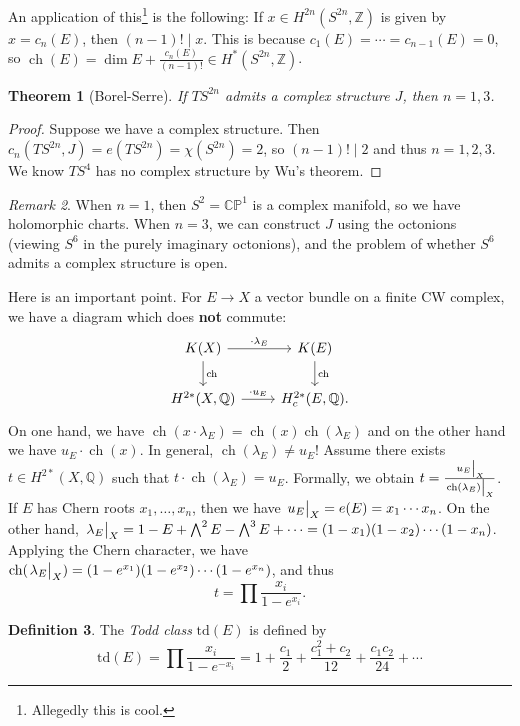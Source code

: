 \documentclass[leqno, openany]{memoir}
\newtheorem{thm}{Theorem}[section]
\theoremstyle{definition}
\newtheorem{defn}[thm]{Definition}
\theoremstyle{remark}
\newtheorem{rmk}[thm]{Remark}
\theoremstyle{plain}
\theoremstyle{definition}
\theoremstyle{remark}
\newcommand{\C}{\mathbb{C}}
\newcommand{\Z}{\mathbb{Z}}
\newcommand{\Q}{\mathbb{Q}}
\renewcommand{\P}{\mathbb{P}}
\newcommand{\mr}[1]{\mathrm{#1}}
\DeclareMathOperator{\ch}{ch}
\begin{document}
An application of this\footnote{Allegedly this is cool.} is the following: If $x \in H^{2n}(S^{2n}, \Z)$ is given by $x = c_n(E)$, then $(n-1)! \mid x$. This is because $c_1(E) = \cdots = c_{n-1}(E) = 0$, so $\ch(E) = \dim E + \frac{c_n(E)}{(n-1)!} \in H^*(S^{2n}, \Z)$.

\begin{thm}[Borel-Serre]
    If $TS^{2n}$ admits a complex structure $J$, then $n = 1, 3$.
\end{thm}

\begin{proof}
    Suppose we have a complex structure. Then $c_n(TS^{2n}, J) = e(TS^{2n}) = \chi(S^{2n}) = 2$, so $(n-1)! \mid 2$ and thus $n = 1,2,3$. We know $TS^4$ has no complex structure by Wu's theorem.
\end{proof}

\begin{rmk}
    When $n =1$, then $S^2 = \C\P^1$ is a complex manifold, so we have holomorphic charts. When $n=3$, we can construct $J$ using the octonions (viewing $S^6$ in the purely imaginary octonions), and the problem of whether $S^6$ admits a complex structure is open.
\end{rmk}

Here is an important point. For $E \to X$ a vector bundle on a finite CW complex, we have a diagram which does \textbf{not} commute:
\begin{equation*}
\begin{tikzcd}
    K(X) \ar{r}{\cdot \lambda_E} \ar{d}{\ch} & K(E) \ar{d}{\ch} \\
    H^{2*}(X, \Q) \ar{r}{\cdot u_E} & H_c^{2*}(E, \Q).
\end{tikzcd}
\end{equation*}
On one hand, we have $\ch(x \cdot \lambda_E) = \ch(x) \ch(\lambda_E)$ and on the other hand we have $u_E \cdot \ch(x)$. In general, $\ch(\lambda_E) \neq u_E$! Assume there exists $t \in H^{2*}(X, \Q)$ such that $t \cdot \ch(\lambda_E) = u_E$. Formally, we obtain $t = \frac{\eval{u_E}_X}{\eval{\ch(\lambda_E)}_X}$. If $E$ has Chern roots $x_1, \ldots, x_n$, then we have $\eval{u_E}_X = e(E) = x_1 \cdots x_n$. On the other hand, $\eval{\lambda_E}_X = 1 - E + \bigwedge^2 E - \bigwedge^3 E + \cdots = (1-x_1)(1-x_2) \cdots (1-x_n)$. Applying the Chern character, we have $\ch(\eval{\lambda_E}_X) = (1-e^{x_1})(1-e^{x_2}) \cdots (1-e^{x_n})$, and thus
\[ t = \prod \frac{x_i}{1-e^{x_i}}. \]

\begin{defn}
    The \textit{Todd class} $\mr{td}(E)$ is defined by
    \[ \mr{td}(E) = \prod \frac{x_i}{1-e^{-x_i}} = 1 + \frac{c_1}{2} + \frac{c_1^2 + c_2}{12} + \frac{c_1c_2}{24} + \cdots \]
\end{defn}
\end{document}

